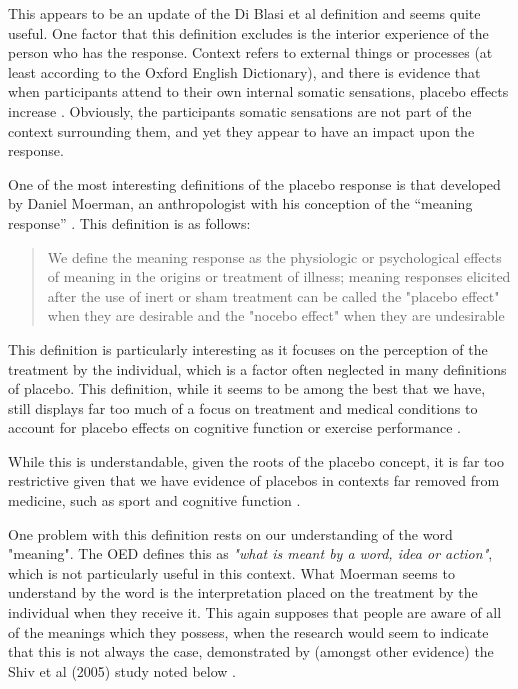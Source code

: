 This appears to be an update of the Di Blasi et al  definition and seems quite useful. One factor that this definition excludes is the interior experience of the person who has the response. Context refers to external things or processes (at least according to the Oxford English Dictionary), and there is evidence that when participants attend to their own internal somatic sensations, placebo effects increase \cite{Geers2006}. Obviously, the participants somatic sensations are not part of the context surrounding them, and yet they appear to have an impact upon the response. 


One of the most interesting definitions of the placebo response is that developed by Daniel Moerman, an anthropologist with his conception of the ``meaning response'' \cite{Moerman2002b,Moerman2002a}. 
This definition is as follows: 

\begin{quotation}
  We define the meaning response as the physiologic or psychological
  effects of meaning in the origins or treatment of illness; meaning
  responses elicited after the use of inert or sham treatment can be
  called the "placebo effect" when they are desirable and the "nocebo
  effect" when they are undesirable
\end{quotation}

This definition is particularly interesting as it focuses on the perception of the treatment by the individual, which is a factor often neglected in many definitions of placebo.  This definition, while it seems to be among the best that we have, still displays far too much of a focus on treatment and medical conditions to account for placebo effects on cognitive function or exercise performance \cite{Crum2007} . 

 While this is understandable, given the roots of the placebo concept, it is far too restrictive given that we have evidence of placebos in contexts far removed from medicine, such as sport and cognitive function \cite{Benedetti2007a,Oken2008}. 

One problem with this definition rests on our understanding of the word "meaning". The OED defines this as \textit{"what is meant by a word, idea or action"}, which is not particularly useful in this context. What Moerman seems to understand by the word is the interpretation placed on the treatment by the individual when they receive it. This again supposes that people are aware of all of the meanings which they possess, when the research would seem to indicate that this is not always the case, demonstrated by (amongst other evidence) the Shiv et al (2005) study noted below  \cite{Shiv2005a}.  

